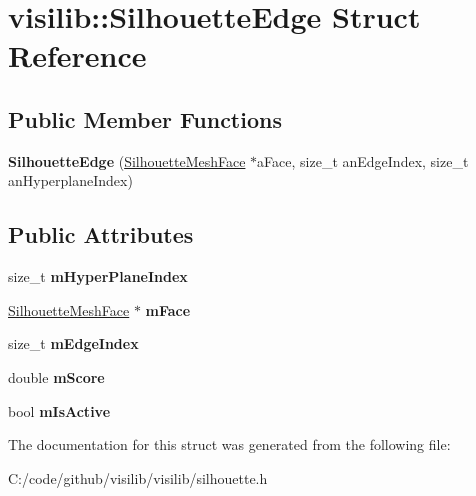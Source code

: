 \hypertarget{structvisilib_1_1_silhouette_edge}{}\section{visilib\+::Silhouette\+Edge Struct Reference}
\label{structvisilib_1_1_silhouette_edge}
\subsection*{Public Member Functions}
\begin{DoxyCompactItemize}
\item 
\mbox{\label{structvisilib_1_1_silhouette_edge_a894736143f0b9d6b0320922216192a46}} 
{\bfseries Silhouette\+Edge} (\mbox{\hyperlink{classvisilib_1_1_silhouette_mesh_face}{Silhouette\+Mesh\+Face}} $\ast$a\+Face, size\+\_\+t an\+Edge\+Index, size\+\_\+t an\+Hyperplane\+Index)
\end{DoxyCompactItemize}
\subsection*{Public Attributes}
\begin{DoxyCompactItemize}
\item 
\mbox{\label{structvisilib_1_1_silhouette_edge_aec1b2891776743cef966392f1959caed}} 
size\+\_\+t {\bfseries m\+Hyper\+Plane\+Index}
\item 
\mbox{\label{structvisilib_1_1_silhouette_edge_abcaefffdb0a72f109060c0053f30c9e1}} 
\mbox{\hyperlink{classvisilib_1_1_silhouette_mesh_face}{Silhouette\+Mesh\+Face}} $\ast$ {\bfseries m\+Face}
\item 
\mbox{\label{structvisilib_1_1_silhouette_edge_add5ccfee703556c1d453d40bcf2fc969}} 
size\+\_\+t {\bfseries m\+Edge\+Index}
\item 
\mbox{\label{structvisilib_1_1_silhouette_edge_af4db80b5161c888d044ad4b7fd15435b}} 
double {\bfseries m\+Score}
\item 
\mbox{\label{structvisilib_1_1_silhouette_edge_ab5327c9ef3df2a50ac8e462b0c24b2e9}} 
bool {\bfseries m\+Is\+Active}
\end{DoxyCompactItemize}


The documentation for this struct was generated from the following file\+:\begin{DoxyCompactItemize}
\item 
C\+:/code/github/visilib/visilib/silhouette.\+h\end{DoxyCompactItemize}
